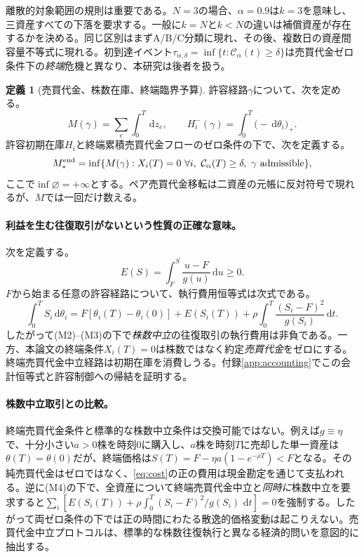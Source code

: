 \documentclass[11pt]{article}
\numberwithin{equation}{section}
\theoremstyle{definition}
\newtheorem{definition}[theorem]{定義}
\theoremstyle{remark}
\newcommand{\Cris}{\mathcal{C}}
\newcommand{\dd}{\,\mathrm{d}}
\begin{document}
離散的対象範囲の規則は重要である。$N=3$の場合、$\alpha=0.9$は$k=3$を意味し、三資産すべての下落を要求する。一般に$k=N$と$k<N$の違いは補償資産が存在するかを決める。同じ区別はまずA/B/C分類に現れ、その後、複数日の資産間容量不等式に現れる。初到達イベント$\tau_{\alpha,\delta}=\inf\{t:\Cris_\alpha(t)\ge\delta\}$は売買代金ゼロ条件下の\emph{終端}危機と異なり、本研究は後者を扱う。

\begin{definition}[売買代金、株数在庫、終端臨界予算]\label{def:budget}
許容経路$\gamma$について、次を定める。
\begin{equation}\label{eq:resource}
M(\gamma)=\sum_e\int_0^T\dd z_e,\qquad
H_i^-(\gamma)=\int_0^T\big(-\dd\theta_i\big)_+.
\end{equation}
許容初期在庫$H_i$と終端累積売買代金フローのゼロ条件の下で、次を定義する。
\begin{equation}\label{eq:minbudget}
M_*^{\rm end}=\inf\{M(\gamma): X_i(T)=0\ \forall i,\ \Cris_\alpha(T)\ge\delta,\ \gamma\text{ admissible}\},
\end{equation}
ここで$\inf\varnothing=+\infty$とする。ペア売買代金移転は二資産の元帳に反対符号で現れるが、$M$では一回だけ数える。
\end{definition}

\paragraph{利益を生む往復取引がないという性質の正確な意味。} 次を定義する。
\begin{equation}\label{eq:E}
E(S)=\int_F^S\frac{u-F}{g(u)}\dd u\ge0.
\end{equation}
$F$から始まる任意の許容経路について、執行費用恒等式は次式である。
\begin{equation}\label{eq:cost}
\boxed{\int_0^T S_i\dd\theta_i=F[\theta_i(T)-\theta_i(0)]+E(S_i(T))
+\rho\int_0^T\frac{(S_i-F)^2}{g(S_i)}\dd t.}
\end{equation}
したがって(M2)--(M3)の下で\emph{株数中立}の往復取引の執行費用は非負である。一方、本論文の終端条件$X_i(T)=0$は株数ではなく約定\emph{売買代金}をゼロにする。終端売買代金中立経路は初期在庫を消費しうる。付録\ref{app:accounting}でこの会計恒等式と許容制御への帰結を証明する。

\paragraph{株数中立取引との比較。}
終端売買代金条件と標準的な株数中立条件は交換可能ではない。例えば$g\equiv\eta$で、十分小さい$a>0$株を時刻$0$に購入し、$a$株を時刻$T$に売却した単一資産は$\theta(T)=\theta(0)$だが、終端価格は$S(T)=F-\eta a(1-e^{-\rho T})<F$となる。その純売買代金はゼロではなく、\eqref{eq:cost}の正の費用は現金勘定を通じて支払われる。逆に(M4)の下で、全資産について終端売買代金中立と\emph{同時に}株数中立を要求すると$\sum_i[E(S_i(T))+\rho\int_0^T(S_i-F)^2/g(S_i)\,\dd t]=0$を強制する。したがって両ゼロ条件の下では正の時間にわたる散逸的価格変動は起こりえない。売買代金中立プロトコルは、標準的な株数往復執行と異なる経済的問いを意図的に抽出する。
\end{document}
